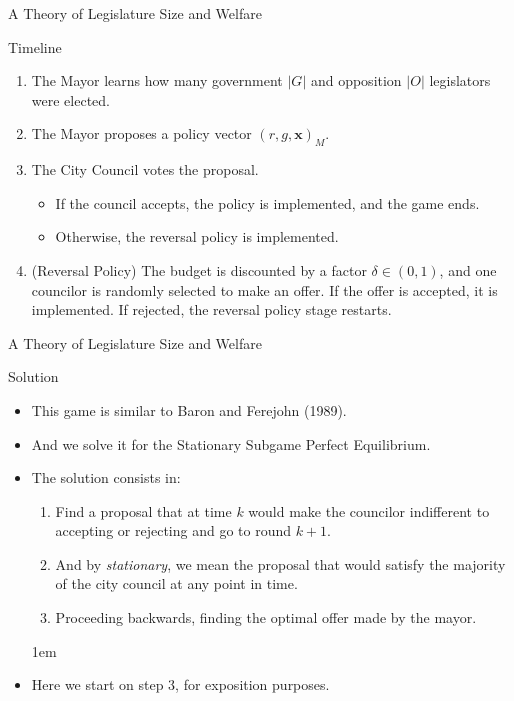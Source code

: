 \documentclass[11pt]{beamer}
\begin{document}
\begin{frame}{A Theory of Legislature Size and Welfare}
\begin{block}{Timeline}
\begin{enumerate}  \itemsep1em
  \item The Mayor learns how many government $|G|$ and opposition $|O|$ legislators were elected.
  \item The Mayor proposes a policy vector $(r, g, \textbf{x})_M$.
  \item The City Council votes the proposal.
  \begin{itemize}
    \item If the council accepts, the policy is implemented, and the game ends. 
    \item Otherwise, the reversal policy is implemented.
  \end{itemize}
  \item (Reversal Policy) The budget is discounted by a factor $\delta \in (0,1)$, and one councilor is randomly selected to make an offer. If the offer is accepted, it is implemented. If rejected, the reversal policy stage restarts.
\end{enumerate}
\end{block}
\end{frame}

\begin{frame}{A Theory of Legislature Size and Welfare}
\begin{block}{Solution}
\begin{itemize}  \itemsep1em
  \item This game is similar to Baron and Ferejohn (1989).
  \item And we solve it for the Stationary Subgame Perfect Equilibrium.
  \item The solution consists in:
  \begin{enumerate} \itemsep1em
      \item Find a proposal that at time $k$ would make the councilor indifferent to accepting or rejecting and go to round  $k+1$.
      \item And by \textit{stationary}, we mean the proposal that would satisfy the majority of the city council at any point in time.
      \item Proceeding backwards, finding the optimal offer made by the mayor.
  \end{enumerate} \itemsep1em
  \item Here we start on step 3, for exposition purposes.
\end{itemize}
\end{block}
\end{frame}
\end{document}
